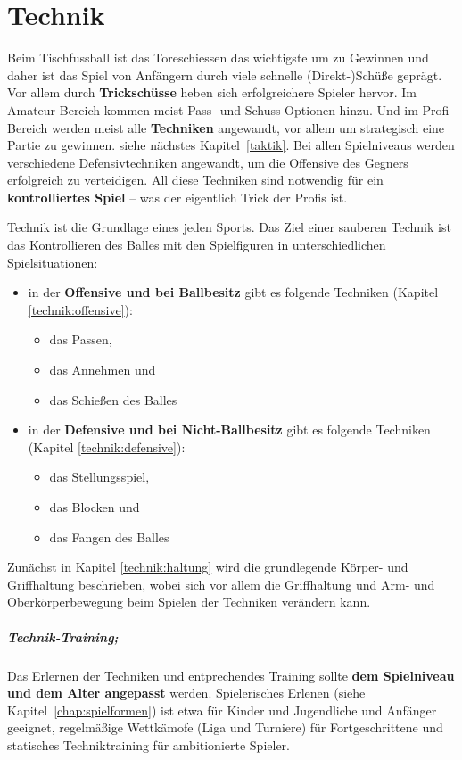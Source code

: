 \chapter{Technik}
\label{technik}

Beim Tischfussball ist das Toreschiessen das wichtigste um zu Gewinnen und daher ist das Spiel von Anfängern durch viele schnelle (Direkt-)Schüße geprägt.
Vor allem durch \textbf{Trickschüsse} heben sich erfolgreichere Spieler hervor.
Im Amateur-Bereich kommen meist Pass- und Schuss-Optionen hinzu.
Und im Profi-Bereich werden meist alle \textbf{Techniken} angewandt, vor allem um strategisch eine Partie zu gewinnen. siehe nächstes Kapitel~\ref{taktik}. 
Bei allen Spielniveaus werden verschiedene Defensivtechniken angewandt, um die Offensive des Gegners erfolgreich zu verteidigen.
All diese Techniken sind notwendig für ein \textbf{kontrolliertes Spiel} -- was der eigentlich Trick der Profis ist.

Technik ist die Grundlage eines jeden Sports. 
Das Ziel einer sauberen Technik ist das Kontrollieren des Balles mit den Spielfiguren in unterschiedlichen Spielsituationen:
\begin{itemize}
    \item in der \textbf{Offensive und bei Ballbesitz} gibt es folgende Techniken (Kapitel \ref{technik:offensive}):
        \begin{itemize}
            \item das Passen, 
            \item das Annehmen und 
            \item das Schießen des Balles
        \end{itemize}
    \item in der \textbf{Defensive  und bei Nicht-Ballbesitz} gibt es folgende Techniken (Kapitel \ref{technik:defensive}):
        \begin{itemize}
            \item das Stellungsspiel, 
            \item das Blocken und 
            \item das Fangen des Balles  
        \end{itemize}
\end{itemize}
Zunächst in Kapitel \ref{technik:haltung} wird die grundlegende Körper- und Griffhaltung beschrieben, wobei sich vor allem die Griffhaltung und Arm- und Oberkörperbewegung beim Spielen der Techniken verändern kann. 

\paragraph{Technik-Training;} 
Das Erlernen der Techniken und entprechendes Training sollte \textbf{dem Spielniveau und dem Alter angepasst} werden. 
Spielerisches Erlenen (siehe Kapitel~\ref{chap:spielformen}) ist etwa für Kinder und Jugendliche und Anfänger geeignet, regelmäßige Wettkämofe (Liga und Turniere) für Fortgeschrittene und statisches Techniktraining für ambitionierte Spieler.


